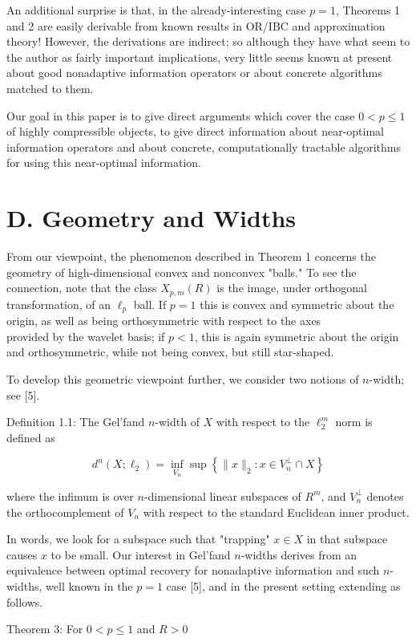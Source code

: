 \documentclass[10pt]{article}
\begin{document}
An additional surprise is that, in the already-interesting case $p=1$, Theorems 1 and 2 are easily derivable from known results in OR/IBC and approximation theory! However, the derivations are indirect; so although they have what seem to the author as fairly important implications, very little seems known at present about good nonadaptive information operators or about concrete algorithms matched to them.

Our goal in this paper is to give direct arguments which cover the case $0<p \leq 1$ of highly compressible objects, to give direct information about near-optimal information operators and about concrete, computationally tractable algorithms for using this near-optimal information.

\section*{D. Geometry and Widths}
From our viewpoint, the phenomenon described in Theorem 1 concerns the geometry of high-dimensional convex and nonconvex "balls." To see the connection, note that the class $X_{p, m}(R)$ is the image, under orthogonal transformation, of an $\ell_{p}$ ball. If $p=1$ this is convex and symmetric about the origin, as well as being orthosymmetric with respect to the axes\\
provided by the wavelet basis; if $p<1$, this is again symmetric about the origin and orthosymmetric, while not being convex, but still star-shaped.

To develop this geometric viewpoint further, we consider two notions of $n$-width; see [5].

Definition 1.1: The Gel'fand $n$-width of $X$ with respect to the $\ell_{2}^{m}$ norm is defined as

$$
d^{n}\left(X ; \ell_{2}\right)=\inf _{V_{n}} \sup \left\{\|x\|_{2}: x \in V_{n}^{\perp} \cap X\right\}
$$

where the infimum is over $n$-dimensional linear subspaces of $R^{m}$, and $V_{n}^{\perp}$ denotes the orthocomplement of $V_{n}$ with respect to the standard Euclidean inner product.

In words, we look for a subspace such that "trapping" $x \in X$ in that subspace causes $x$ to be small. Our interest in Gel'fand $n$-widths derives from an equivalence between optimal recovery for nonadaptive information and such $n$-widths, well known in the $p=1$ case [5], and in the present setting extending as follows.

Theorem 3: For $0<p \leq 1$ and $R>0$
\end{document}
